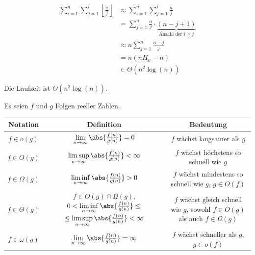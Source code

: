 \begin{questions}
\begin{solution}
                \begin{align*}
                    \sum_{i=1}^{n} \sum_{j=1}^{i} \left\lfloor \frac{n}{j} \right\rfloor &\approx \sum_{i=1}^{n} \sum_{j=1}^{i} \frac{n}{j} \\
                    &= \sum_{j=1}^{n} \frac{n}{j} \cdot \underbrace{(n - j + 1)}_{\text{Anzahl der } i \geq j} \\
                    &\approx n \sum_{j=1}^{n} \frac{n-j}{j} \\
                    &= n \left( n H_n - n \right) \\
                    &\in \Theta(n^2 \log(n))
                \end{align*}
                
                Die Laufzeit ist $\Theta(n^2 \log(n))$.
            \end{solution}


	\clearpage
	\begin{center}
	Es seien $f$ und $g$ Folgen reeller Zahlen.\\
    \end{center}
	\vspace{0.5cm}
	\centering
	\small
	\begin{tabular}{|c|c|c|}
		\hline
		\textbf{Notation} & \textbf{Definition}                                              & \textbf{Bedeutung}                                  \\
		\hline
		$f \in o(g)$      & $\lim\limits_{n \to \infty} \abs{\frac{f(n)}{g(n)}} = 0$         & $f$ wächst langsamer als $g$                        \\
		\hline
		$f \in O(g)$      & $\limsup\limits_{n \to \infty} \abs{\frac{f(n)}{g(n)}} < \infty$ & $f$ wächst höchstens so schnell wie $g$             \\
		\hline
		$f \in \Omega(g)$ & $\liminf\limits_{n \to \infty} \abs{\frac{f(n)}{g(n)}} > 0$      & \makecell{$f$ wächst mindestens so schnell wie $g$, \\$g\in O(f)$}                          \\
		\hline
		$f \in \Theta(g)$ & \makecell{$f \in O(g)\cap \Omega(g)$,                                                                                  \\ $0 < \liminf\limits_{n \to \infty} \abs{\frac{f(n)}{g(n)}} \leq$ \\ $\leq\limsup\limits_{n \to \infty} \abs{\frac{f(n)}{g(n)}} < \infty$} & \makecell{$f$ wächst gleich schnell wie $g$,        \\sowohl $f\in O(g)$ als auch $f\in\Omega(g)$} \\
		\hline
		$f \in \omega(g)$ & $\lim\limits_{n \to \infty} \abs{\frac{f(n)}{g(n)}} = \infty$    & \makecell{$f$ wächst schneller als $g$,             \\$g\in o(f)$}                                      \\
		\hline
	\end{tabular}


\end{questions}

